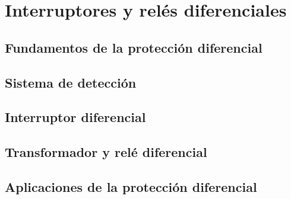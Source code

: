 \section{Interruptores y relés diferenciales}
\subsection{Fundamentos de la protección diferencial}
\subsection{Sistema de detección}
\subsection{Interruptor diferencial}
\subsection{Transformador y relé diferencial}
\subsection{Aplicaciones de la protección diferencial}